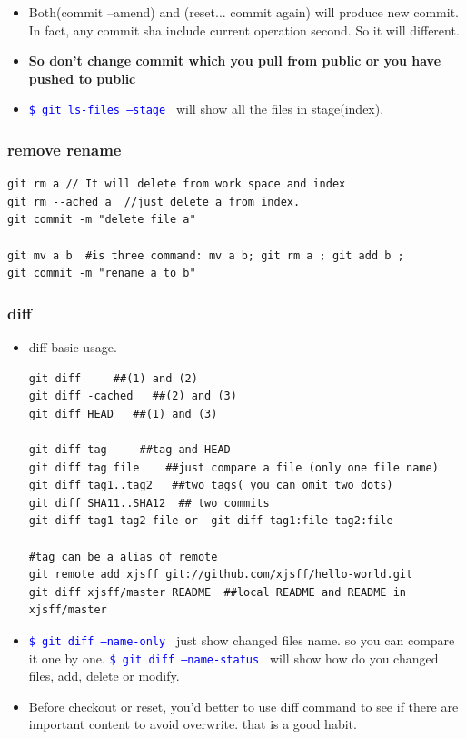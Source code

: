 \documentclass[a4paper,12pt,twoside]{book}
\newcommand{\linuxcommand}[1]{\texttt{\textcolor{blue}{\$ #1 \Pisymbol{psy}{191}}}}
\begin{document}
\begin{itemize}
\begin{itemize}
   \item Both(commit --amend) and (reset... commit again) will produce new commit. In fact, any commit sha include current operation second. So it will different. 
   
   \item \textbf{So don't change commit which you pull from public or you have pushed to public} 
        
   \item \linuxcommand{git ls-files --stage} will show all the files in stage(index).    
\end{itemize}

\subsubsection{remove rename}
\begin{verbatim}
git rm a // It will delete from work space and index
git rm --ached a  //just delete a from index.
git commit -m "delete file a"

git mv a b  #is three command: mv a b; git rm a ; git add b ;
git commit -m "rename a to b"
\end{verbatim}

\subsubsection{diff}
\begin{itemize}
\item diff basic usage. 

\begin{verbatim}
git diff     ##(1) and (2)
git diff -cached   ##(2) and (3)
git diff HEAD   ##(1) and (3)

git diff tag     ##tag and HEAD
git diff tag file    ##just compare a file (only one file name)
git diff tag1..tag2   ##two tags( you can omit two dots)
git diff SHA11..SHA12  ## two commits
git diff tag1 tag2 file or  git diff tag1:file tag2:file

#tag can be a alias of remote
git remote add xjsff git://github.com/xjsff/hello-world.git
git diff xjsff/master README  ##local README and README in xjsff/master
\end{verbatim}
		\item \linuxcommand{git diff --name-only} just show changed files name. so you can compare it one by one.  \linuxcommand{git diff --name-status} will show how do you changed files, add, delete or modify. 

		\item Before checkout or reset, you'd better to use diff command to see if there are important content to avoid overwrite. that is a good habit. 


\end{itemize}
\end{itemize}
\end{document}
